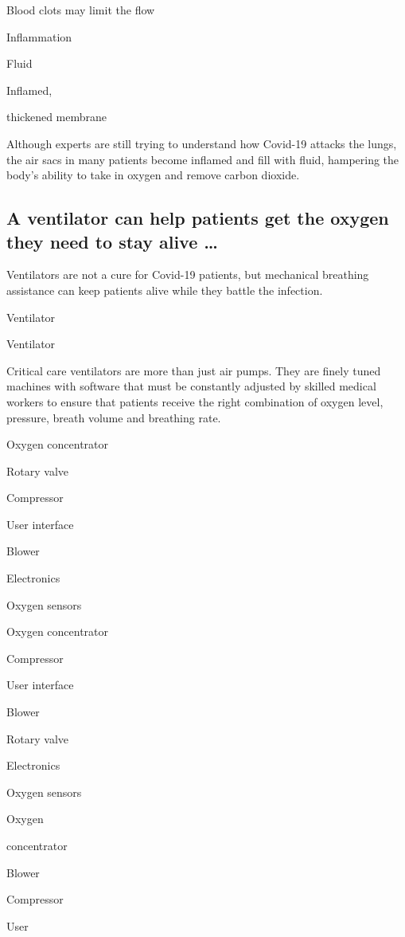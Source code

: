 Blood clots may limit the flow

Inflammation

Fluid

Inflamed,

thickened membrane

Although experts are still trying to understand how Covid-19 attacks the
lungs, the air sacs in many patients become inflamed and fill with
fluid, hampering the body's ability to take in oxygen and remove carbon
dioxide.

\hypertarget{a-ventilator-can-help-patients-get-the-oxygen-they-need-to-stay-alive-}{%
\subsection{A ventilator can help patients get the oxygen they need to
stay alive
\ldots{}}\label{a-ventilator-can-help-patients-get-the-oxygen-they-need-to-stay-alive-}}

Ventilators are not a cure for Covid-19 patients, but mechanical
breathing assistance can keep patients alive while they battle the
infection.

Ventilator

Ventilator

Critical care ventilators are more than just air pumps. They are finely
tuned machines with software that must be constantly adjusted by skilled
medical workers to ensure that patients receive the right combination of
oxygen level, pressure, breath volume and breathing rate.

Oxygen concentrator

Rotary valve

Compressor

User interface

Blower

Electronics

Oxygen sensors

Oxygen concentrator

Compressor

User interface

Blower

Rotary valve

Electronics

Oxygen sensors

Oxygen

concentrator

Blower

Compressor

User

